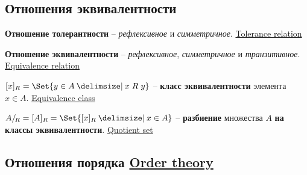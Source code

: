 \documentclass[a4paper,10pt]{article}
\begin{document}
\subsection{Отношения эквивалентности}

\begin{terms}
    \item \textbf{Отношение толерантности} \--- \textit{рефлексивное} и \textit{симметричное}.
    \hfill\href{https://en.wikipedia.org/wiki/Tolerance_relation}{Tolerance relation}

    \item \textbf{Отношение эквивалентности} \--- \textit{рефлексивное}, \textit{симметричное} и \textit{транзитивное}.
    \hfill\href{https://en.wikipedia.org/wiki/Equivalence_relation}{Equivalence relation}

    \item $\equivclass{x} = \Set{y \in A \given x \rel y}$ \--- \textbf{класс эквивалентности} элемента $x \in A$.
    \hfill\href{https://en.wikipedia.org/wiki/Equivalence_class}{Equivalence class}

    \item $\quotient[R]{A} = \equivclass{A} = \Set{\equivclass{x} \given x \in A}$ \--- \textbf{разбиение} множества $A$ \textbf{на классы эквивалентности}.
    \hfill\href{https://en.wikipedia.org/wiki/Quotient_set}{Quotient set}
\end{terms}


\subsection{Отношения порядка%
\texorpdfstring{\hfill\normalfont\href{https://en.wikipedia.org/wiki/Order_theory}{Order theory}}{}}
\end{document}
